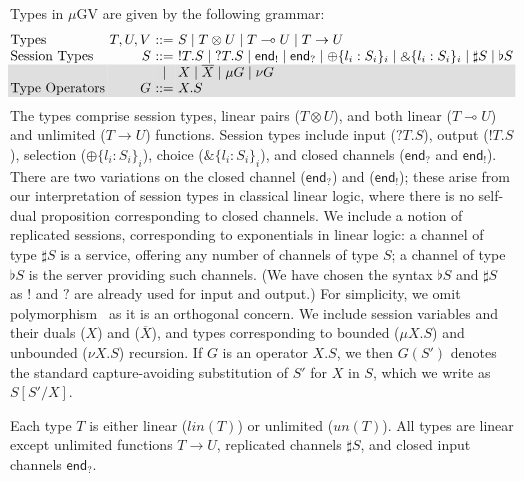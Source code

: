 \documentclass[orivec,envcountsame]{llncs}
\newcommand{\with}{\mathbin\binampersand}
\newcommand{\gvdual}[1]{\overline{#1}}
\newcommand{\gvout}[2]{{!#1.#2}}
\newcommand{\gvin}[2]{{?#1.#2}}
\newcommand{\lto}{\ensuremath{\multimap}}
\newcommand{\uto}{\ensuremath{\rightarrow}}
\newcommand{\outterm}{\mkwd{end}_!}
\newcommand{\interm}{\mkwd{end}_?}
\newcommand{\gvserver}[1]{\flat #1}
\newcommand{\gvservice}[1]{\sharp #1}
\newcommand{\mkwd}[1]{\mathsf{#1}}
\newcommand{\un}{un}
\newcommand{\lin}{lin}
\newcommand{\mugv}{$\mu\mathrm{GV}$\xspace}
\newcommand\shaderow{\noalign{\vskip-0.4pt}\rowcolor{shade}[0.6mm]}
\begin{document}
Types in \mugv are given by the following grammar:
\small
\[
\begin{array}{@{}l@{~}r@{~}c@{~}l@{}}
  \text{Types}         & T,U,V & ::= & S \mid T \otimes U \mid T \lto U \mid T \uto U \\
  \text{Session Types} & S     & ::= & \gvout{T}{S} \mid \gvin{T}{S}
                                \mid   \outterm \mid \interm
                                \mid   \oplus \{ l_i : S_i \}_i \mid \with \{ l_i : S_i \}_i
                                \mid   \gvservice{S} \mid \gvserver{S} \\ \shaderow
                            & & \mid & X \mid \gvdual{X}
                                \mid   {\mu G} \mid {\nu G} \\  \shaderow
  \text{Type Operators} & G    & ::= & X.S \\
\end{array}
\]\normalsize%
%
The types comprise session types, linear pairs ($T \otimes U$), and both linear ($T \lto U$) and
unlimited ($T \uto U$) functions.
%
Session types include input ($\gvin{T}{S}$), output ($\gvout{T}{S}$), selection ($\oplus\{ l_i:S_i
\}_i$), choice ($\with\{l_i:S_i\}_i$), and closed channels ($\interm$ and $\outterm$). There are two
variations on the closed channel ($\interm$) and ($\outterm$); these arise from our interpretation
of session types in classical linear logic, where there is no self-dual proposition corresponding to
closed channels.  We include a notion of replicated sessions, corresponding to exponentials in
linear logic: a channel of type $\gvservice{S}$ is a service, offering any number of channels of
type $S$; a channel of type $\gvserver{S}$ is the server providing such channels. (We have chosen
the syntax $\gvserver{S}$ and $\gvservice{S}$ as $!$ and $?$ are already used for input and output.)
%
For simplicity, we omit polymorphism~\citep{LindleyM14} as it is an orthogonal concern.
%
We include session variables and their duals ($X$) and ($\gvdual{X}$), and types corresponding to
bounded ($\mu X.S$) and unbounded ($\nu X.S$) recursion. If $G$ is an operator $X.S$, we then
$G(S')$ denotes the standard capture-avoiding substitution of $S'$ for $X$ in $S$, which we write as
$S[S'/X]$.

Each type $T$ is either linear ($\lin(T)$) or unlimited ($\un(T)$).
All types are linear except unlimited functions $T \uto U$, replicated channels $\gvservice{S}$, and
closed input channels $\interm$.
\end{document}
